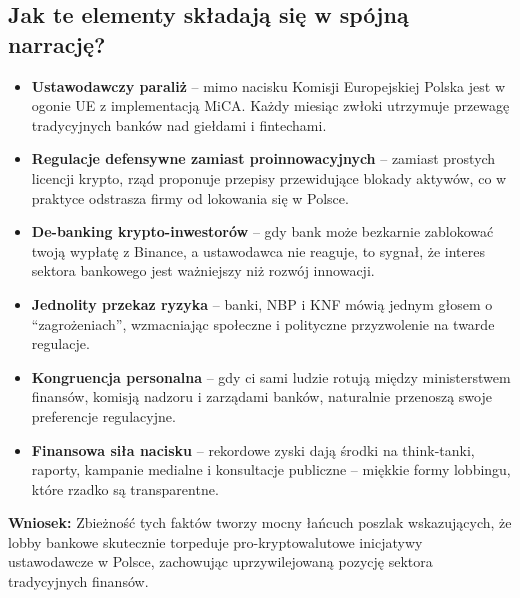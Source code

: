 \documentclass[9pt]{article}
\begin{document}
\subsection*{Jak te elementy składają się w spójną narrację?}
	\vspace{2em}
\begin{itemize}[left=0pt, itemsep=1em]
	
	\item \textbf{Ustawodawczy paraliż} – mimo nacisku Komisji Europejskiej Polska jest w ogonie UE z implementacją MiCA. Każdy miesiąc zwłoki utrzymuje przewagę tradycyjnych banków nad giełdami i fintechami.
	
	\item \textbf{Regulacje defensywne zamiast proinnowacyjnych} – zamiast prostych licencji krypto, rząd proponuje przepisy przewidujące blokady aktywów, co w praktyce odstrasza firmy od lokowania się w Polsce.
	
	\item \textbf{De-banking krypto-inwestorów} – gdy bank może bezkarnie zablokować twoją wypłatę z Binance, a ustawodawca nie reaguje, to sygnał, że interes sektora bankowego jest ważniejszy niż rozwój innowacji.
	
	\item \textbf{Jednolity przekaz ryzyka} – banki, NBP i KNF mówią jednym głosem o “zagrożeniach”, wzmacniając społeczne i polityczne przyzwolenie na twarde regulacje.
	
	\item \textbf{Kongruencja personalna} – gdy ci sami ludzie rotują między ministerstwem finansów, komisją nadzoru i zarządami banków, naturalnie przenoszą swoje preferencje regulacyjne.
	
	\item \textbf{Finansowa siła nacisku} – rekordowe zyski dają środki na think-tanki, raporty, kampanie medialne i konsultacje publiczne – miękkie formy lobbingu, które rzadko są transparentne.
	
\end{itemize}


	\noindent \textbf{Wniosek:} Zbieżność tych faktów tworzy mocny łańcuch poszlak wskazujących, że lobby bankowe skutecznie torpeduje pro-kryptowalutowe inicjatywy ustawodawcze w Polsce, zachowując uprzywilejowaną pozycję sektora tradycyjnych finansów.

	
\end{document}
